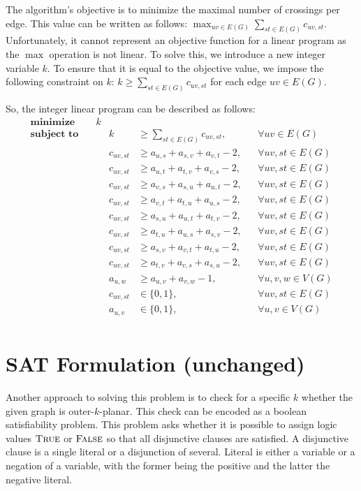 The algorithm's objective is to minimize the maximal number of crossings per edge.
This value can be written as follows: $\max_{uv \in E(G)} \sum_{st \in E(G)} c_{uv, st}$.
Unfortunately, it cannot represent an objective function for a linear program as the $\max$ operation is not linear.
To solve this, we introduce a new integer variable $k$.
To ensure that it is equal to the objective value, we impose the following constraint on $k$: $k \geqslant \sum_{st \in E(G)} c_{uv, st}$ for each edge $uv \in E(G)$.

So, the integer linear program can be described as follows:
\begin{align*}
    \textbf{minimize}\quad&k\\
    \textbf{subject to}\quad&&k &\geqslant \sum_{st \in E(G)} c_{uv, st},&&\forall uv \in E(G)\\
    &&c_{uv, st} &\geqslant a_{u,s} + a_{s,v} + a_{v,t} - 2,&&\forall uv, st \in E(G)\\
    &&c_{uv, st} &\geqslant a_{u,t} + a_{t,v} + a_{v,s} - 2,&&\forall uv, st \in E(G)\\
    &&c_{uv, st} &\geqslant a_{v,s} + a_{s,u} + a_{u,t} - 2,&&\forall uv, st \in E(G)\\
    &&c_{uv, st} &\geqslant a_{v,t} + a_{t,u} + a_{u,s} - 2,&&\forall uv, st \in E(G)\\
    &&c_{uv, st} &\geqslant a_{s,u} + a_{u,t} + a_{t,v} - 2,&&\forall uv, st \in E(G)\\
    &&c_{uv, st} &\geqslant a_{t,u} + a_{u,s} + a_{s,v} - 2,&&\forall uv, st \in E(G)\\
    &&c_{uv, st} &\geqslant a_{s,v} + a_{v,t} + a_{t,u} - 2,&&\forall uv, st \in E(G)\\
    &&c_{uv, st} &\geqslant a_{t,v} + a_{v,s} + a_{s,u} - 2,&&\forall uv, st \in E(G)\\
    &&a_{u, w} &\geqslant a_{u, v} + a_{v, w} - 1,&&\forall u, v, w \in V(G)\\
    &&c_{uv, st} &\in \{0, 1\},&&\forall uv, st \in E(G)\\
    &&a_{u, v} &\in \{0, 1\},&&\forall u, v \in V(G)\\
\end{align*}

\section{SAT Formulation (unchanged)}\label{sec:SAT-def}

Another approach to solving this problem is to check for a specific $k$ whether the given graph is outer-$k$-planar.
This check can be encoded as a boolean satisfiability problem.
This problem asks whether it is possible to assign logic values $\textsc{True}$ or $\textsc{False}$ so that all disjunctive clauses are satisfied.
A disjunctive clause is a single literal or a disjunction of several.
Literal is either a variable or a negation of a variable, with the former being the positive and the latter the negative literal.



